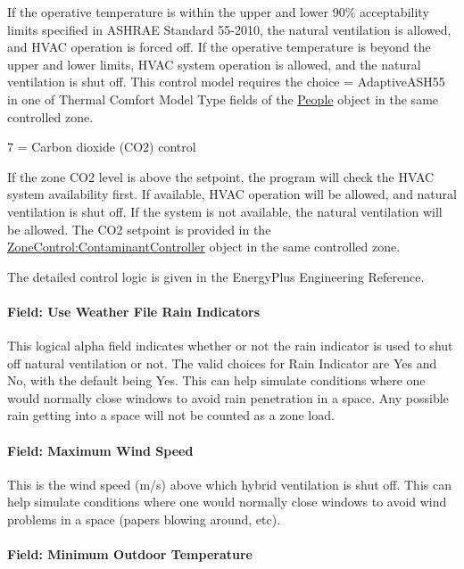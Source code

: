 \begin{description}
  If the operative temperature is within the upper and lower 90\% acceptability limits specified in ASHRAE Standard 55-2010, the natural ventilation is allowed, and HVAC operation is forced off. If the operative temperature is beyond the upper and lower limits, HVAC system operation is allowed, and the natural ventilation is shut off.
  This control model requires the choice = AdaptiveASH55 in one of Thermal Comfort Model Type fields of the \hyperref[people]{People} object in the same controlled zone.
  \item
  7 = Carbon dioxide (CO2) control

  If the zone CO2 level is above the setpoint, the program will check the HVAC system availability first. If available, HVAC operation will be allowed, and natural ventilation is shut off. If the system is not available, the natural ventilation will be allowed.
  The CO2 setpoint is provided in the \hyperref[zonecontrolcontaminantcontroller]{ZoneControl:ContaminantController} object in the same controlled zone.
\end{description}

The detailed control logic is given in the EnergyPlus Engineering Reference.

\paragraph{Field: Use Weather File Rain Indicators}\label{field-use-weather-file-rain-indicators-000}

This logical alpha field indicates whether or not the rain indicator is used to shut off natural ventilation or not. The valid choices for Rain Indicator are Yes and No, with the default being Yes. This can help simulate conditions where one would normally close windows to avoid rain penetration in a space. Any possible rain getting into a space will not be counted as a zone load.

\paragraph{Field: Maximum Wind Speed}\label{field-maximum-wind-speed-000}

This is the wind speed (m/s) above which hybrid ventilation is shut off. This can help simulate conditions where one would normally close windows to avoid wind problems in a space (papers blowing around, etc).

\paragraph{Field: Minimum Outdoor Temperature}\label{field-minimum-outdoor-temperature-000}

